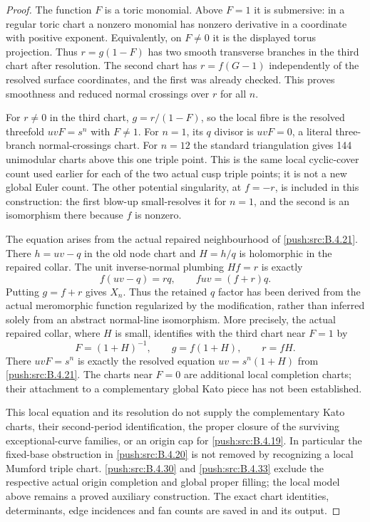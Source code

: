 \begin{proof}
The function $F$ is a toric monomial. Above $F=1$
it is submersive: in a regular toric chart a
nonzero monomial has nonzero derivative in a
coordinate with positive exponent. Equivalently,
on $F\ne0$ it is the displayed torus projection.
Thus $r=g(1-F)$ has two smooth transverse
branches in the third chart after resolution.
The second chart has $r=f(G-1)$ independently
of the resolved surface coordinates, and the
first was already checked. This proves smoothness
and reduced normal crossings over $r$ for all $n$.

For $r\ne0$ in the third chart,
$g=r/(1-F)$, so the local fibre is the resolved
threefold $uvF=s^n$ with $F\ne1$.
For $n=1$, its $q$ divisor is $uvF=0$, a literal
three-branch normal-crossings chart. For $n=12$
the standard triangulation gives 144 unimodular
charts above this one triple point. This is the
same local cyclic-cover count used earlier for
each of the two actual cusp triple points; it
is not a new global Euler count. The other
potential singularity, at $f=-r$, is included
in this construction: the first blow-up small-resolves it
for $n=1$, and the second is an isomorphism there
because $f$ is nonzero.

The equation arises from the actual repaired
neighbourhood of \ref{push:src:B.4.21}. There $h=uv-q$ in the
old node chart and $H=h/q$ is holomorphic in the
repaired collar. The unit inverse-normal plumbing
$Hf=r$ is exactly
\[
 f(uv-q)=rq,
 \qquad fuv=(f+r)q.
\]
Putting $g=f+r$ gives $X_n$. Thus the retained
$q$ factor has been derived from the actual
meromorphic function regularized by the
modification, rather than inferred solely from
an abstract normal-line isomorphism.
More precisely, the actual repaired collar, where $H$ is small,
identifies with the third chart near $F=1$ by
\[
 F=(1+H)^{-1},\qquad g=f(1+H),\qquad r=fH.
\]
There $uvF=s^n$ is exactly the resolved equation
$uv=s^n(1+H)$ from \ref{push:src:B.4.21}. The charts near $F=0$
are additional local completion charts; their attachment
to a complementary global Kato piece has not been established.

This local equation and its resolution do not
supply the complementary Kato charts, their
second-period identification, the proper closure
of the surviving exceptional-curve families, or
an origin cap for \ref{push:src:B.4.19}. In particular the
fixed-base obstruction in \ref{push:src:B.4.20} is not removed
by recognizing a local Mumford triple chart. \ref{push:src:B.4.30} and
\ref{push:src:B.4.33} exclude the respective actual origin completion
and global proper filling; the local model above remains
a proved auxiliary construction.
The exact chart identities, determinants, edge
incidences and fan counts are saved in
 and its
output.


\end{proof}
